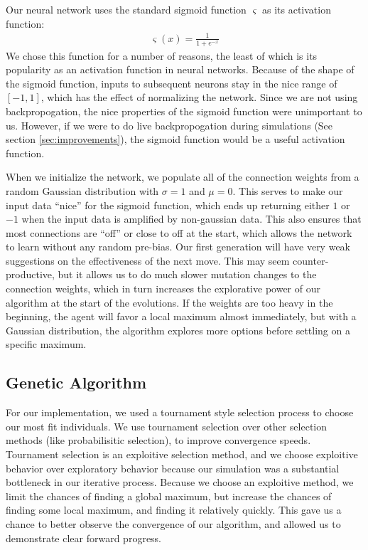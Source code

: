 \documentclass{article}
\begin{document}
\begin{multicols}{2}
Our neural network uses the standard sigmoid function $\varsigma$ as its
activation function:
\begin{align*}
  \varsigma(x) = \frac{1}{1 + e^{-x}}
\end{align*}
We chose this function for a number of reasons, the least of which is its
popularity as an activation function in neural networks. Because of the shape of
the sigmoid function, inputs to subsequent neurons stay in the nice range of
$[-1, 1]$, which has the effect of normalizing the network. Since we are not
using backpropogation, the nice properties of the sigmoid function were
unimportant to us. However, if we were to do live backpropogation during
simulations (See section \ref{sec:improvements}), the sigmoid function would be
a useful activation function.

When we initialize the network, we populate all of the connection weights from a
random Gaussian distribution with $\sigma = 1$ and $\mu = 0$. This serves to
make our input data ``nice'' for the sigmoid function, which ends up returning
either $1$ or $-1$ when the input data is amplified by non-gaussian data. This
also ensures that most connections are ``off'' or close to off at the start,
which allows the network to learn without any random pre-bias. Our first
generation will have very weak suggestions on the effectiveness of the next
move. This may seem counter-productive, but it allows us to do much slower
mutation changes to the connection weights, which in turn increases the
explorative power of our algorithm at the start of the evolutions. If the
weights are too heavy in the beginning, the agent will favor a local maximum
almost immediately, but with a Gaussian distribution, the algorithm explores
more options before settling on a specific maximum.

\subsection{Genetic Algorithm}
For our implementation, we used a tournament style selection process to choose
our most fit individuals. We use tournament selection over other selection
methods (like probabilisitic selection), to improve convergence speeds.
Tournament selection is an exploitive selection method, and we choose exploitive
behavior over exploratory behavior because our simulation was a substantial
bottleneck in our iterative process. Because we choose an exploitive method, we
limit the chances of finding a global maximum, but increase the chances of
finding some local maximum, and finding it relatively quickly. This gave us a
chance to better observe the convergence of our algorithm, and allowed us to
demonstrate clear forward progress.


\end{multicols}
\end{document}
